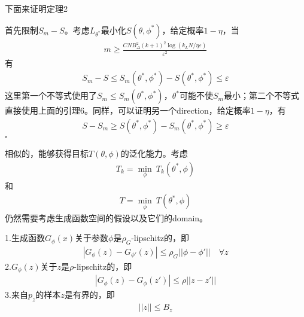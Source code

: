             \par
            下面来证明定理2
            \begin{Proof}
            首先限制$S_m - S$。考虑$L_{\theta^*}$最小化$S(\theta,\phi^*)$，给定概率$1-\eta$，当
            \begin{align*}
            m \geqslant \frac{CNB_\Delta^2(k+1)^2\log (k_LN/\eta\varepsilon)}{\varepsilon^2}
            \end{align*}
            有
            \begin{align*}
            S_m - S \leqslant S_m(\theta^*,\phi^*) - S(\theta^*,\phi^*) \leqslant \varepsilon
            \end{align*}
            这里第一个不等式使用了$S_m \leqslant S_m(\theta^*,\phi^*)$，$\theta^*$可能不使$S_m$最小；第二个不等式直接使用上面的引理6。同样，可以证明另一个direction，给定概率$1-\eta$，有
            \begin{align*}
            S-S_m \geqslant S(\theta^*,\phi^*) - S_m(\theta^*,\phi^*) \geqslant \varepsilon
            \end{align*}
            $\square$
            \end{Proof}
            \par
            相似的，能够获得目标$T(\theta,\phi)$的泛化能力。考虑
            \begin{align*}
            T_k = \min_\phi \ T_k(\theta^*,\phi)
            \end{align*}
            和
            \begin{align*}
            T = \min_\phi \ T(\theta^*,\phi)
            \end{align*}
            仍然需要考虑生成函数空间的假设以及它们的domain。
            \begin{Assumption}[3]
            1.生成函数$G_\phi(x)$关于参数$\phi$是$\rho_G$-lipschitz的，即
            \begin{align*}
            |G_\phi(z) - G_{\phi'}(z)| \leqslant \rho_G||\phi - \phi'||\quad \forall z
            \end{align*}
            2.$G_\phi(z)$关于$z$是$\rho$-lipschitz的，即
            \begin{align*}
            |G_\phi(z) - G_\phi(z')| \leqslant \rho||z - z'||
            \end{align*}
            3.来自$p_z$的样本$z$是有界的，即
            \begin{align*}
            ||z|| \leqslant B_z
            \end{align*}

            \end{Assumption}
